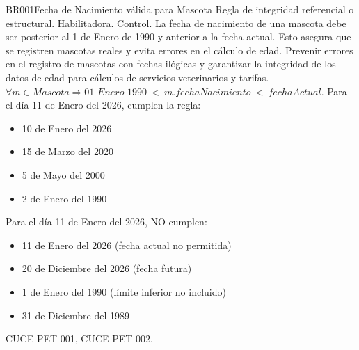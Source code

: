 
\begin{BussinesRule}{BR001}{Fecha de Nacimiento válida para Mascota}
	\BRitem[Tipo:] Regla de integridad referencial o estructural.
	\BRitem[Clase:] Habilitadora.
	\BRitem[Nivel:] Control.
	\BRitem[Descripción:] La fecha de nacimiento de una mascota debe ser posterior al 1 de Enero de 1990 y anterior a la fecha actual. Esto asegura que se registren mascotas reales y evita errores en el cálculo de edad.
	\BRitem[Motivación:] Prevenir errores en el registro de mascotas con fechas ilógicas y garantizar la integridad de los datos de edad para cálculos de servicios veterinarios y tarifas.
	\BRitem[Sentencia:] $\forall m \in Mascota \Rightarrow 01\textrm{-}Enero\textrm{-}1990~<~m.fechaNacimiento~<~fechaActual$.
	 Para el día 11 de Enero del 2026, cumplen la regla:
		\begin{itemize}
			\item 10 de Enero del 2026
			\item 15 de Marzo del 2020
			\item 5 de Mayo del 2000
			\item 2 de Enero del 1990
		\end{itemize}
	 Para el día 11 de Enero del 2026, NO cumplen:
		\begin{itemize}
			\item 11 de Enero del 2026 (fecha actual no permitida)
			\item 20 de Diciembre del 2026 (fecha futura)
			\item 1 de Enero del 1990 (límite inferior no incluido)
			\item 31 de Diciembre del 1989
		\end{itemize}
	 CUCE-PET-001, CUCE-PET-002.
\end{BussinesRule}

